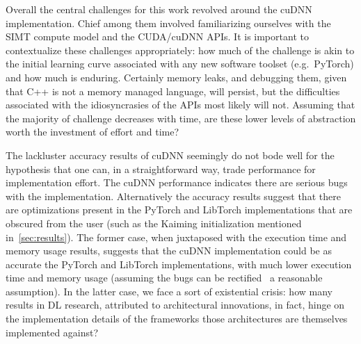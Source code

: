 
Overall the central challenges for this work revolved around the cuDNN implementation.
Chief among them involved familiarizing ourselves with the SIMT compute model and the CUDA/cuDNN APIs.
It is important to contextualize these challenges appropriately: how much of the challenge is akin to the initial learning curve associated with any new software toolset (e.g.\ PyTorch) and how much is enduring.
Certainly memory leaks, and debugging them, given that C++ is not a memory managed language, will persist, but the difficulties associated with the idiosyncrasies of the APIs most likely will not.
Assuming that the majority of challenge decreases with time, are these lower levels of abstraction worth the investment of effort and time?

The lackluster accuracy results of cuDNN seemingly do not bode well for the hypothesis that one can, in a straightforward way, trade performance for implementation effort.
The cuDNN performance indicates there are serious bugs with the implementation.
Alternatively the accuracy results suggest that there are optimizations present in the PyTorch and LibTorch implementations that are obscured from the user (such as the Kaiming initialization mentioned in~\cref{sec:results}).
The former case, when juxtaposed with the execution time and memory usage results, suggests that the cuDNN implementation could be as accurate the PyTorch and LibTorch implementations, with much lower execution time and memory usage (assuming the bugs can be rectified \textemdash\ a reasonable assumption).
In the latter case, we face a sort of existential crisis: how many results in DL research, attributed to architectural innovations, in fact, hinge on the implementation details of the frameworks those architectures are themselves implemented against?

